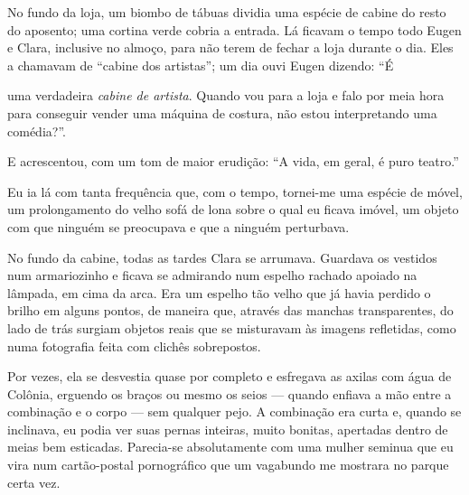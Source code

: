 No fundo da loja, um biombo de tábuas dividia uma espécie de cabine do resto
do aposento; uma cortina verde cobria a entrada. Lá ficavam o tempo todo
Eugen e Clara, inclusive no almoço, para não terem de fechar a loja durante o
dia. Eles a chamavam de ``cabine dos artistas''; um dia ouvi Eugen dizendo:
``É\linebreak

\pagebreak

\noindent{}uma verdadeira \textit{cabine de artista}. Quando vou para a loja e falo
por meia hora para conseguir vender uma máquina de costura, não estou
interpretando uma comédia?''.

E acrescentou, com um tom de maior erudição: ``A vida, em geral, é puro
teatro.''


Eu ia lá com tanta frequência que, com o tempo, tornei-me uma espécie de
móvel, um prolongamento do velho sofá de lona sobre o qual eu ficava imóvel,
um objeto com que ninguém se preocupava e que a ninguém perturbava.

No fundo da cabine, todas as tardes Clara se arrumava. Guardava os vestidos
num armariozinho e ficava se admirando num espelho rachado apoiado na
lâmpada, em cima da arca. Era um espelho tão velho que já havia perdido o
brilho em alguns pontos, de maneira que, através das manchas transparentes,
do lado de trás surgiam objetos reais que se misturavam às imagens
refletidas, como numa fotografia feita com clichês sobrepostos.

Por vezes, ela se desvestia quase por completo e esfregava as axilas com água
de Colônia, erguendo os braços ou mesmo os seios --- quando enfiava a mão
entre a combinação e o corpo --- sem qualquer pejo. A combinação era curta e,
quando se inclinava, eu podia ver suas pernas inteiras, muito bonitas,
apertadas dentro de meias bem esticadas. Parecia-se absolutamente com uma
mulher seminua que eu vira num cartão-postal pornográfico que um vagabundo me
mostrara no parque certa vez.

